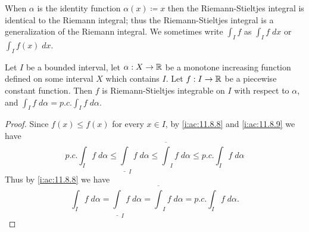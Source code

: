 \begin{note}
  When \(\alpha\) is the identity function \(\alpha(x) \coloneqq x\) then the Riemann-Stieltjes integral is identical to the Riemann integral;
  thus the Riemann-Stieltjes integral is a generalization of the Riemann integral.
  We sometimes write \(\int_I f\) as \(\int_I f \; dx\) or \(\int_I f(x) \; dx\).
\end{note}

\begin{ac}\label{i:ac:11.8.10}
  Let \(I\) be a bounded interval, let \(\alpha : X \to \mathbb{R}\) be a monotone increasing function defined on some interval \(X\) which contains \(I\).
  Let \(f : I \to \mathbb{R}\) be a piecewise constant function.
  Then \(f\) is Riemann-Stieltjes integrable on \(I\) with respect to \(\alpha\), and \(\int_I f \; d \alpha = p.c. \int_I f \; d \alpha\).
\end{ac}

\begin{proof}
  Since \(f(x) \leq f(x)\) for every \(x \in I\), by \cref{i:ac:11.8.8} and \cref{i:ac:11.8.9} we have
  \[
    p.c. \int_I f \; d \alpha \leq \underline{\int}_I f \; d \alpha \leq \overline{\int}_I f \; d \alpha \leq p.c. \int_I f \; d \alpha
  \]
  Thus by \cref{i:ac:11.8.8} we have
  \[
    \int_I f \; d \alpha = \underline{\int}_I f \; d \alpha = \overline{\int}_I f \; d \alpha = p.c. \int_I f \; d \alpha.
  \]
\end{proof}

